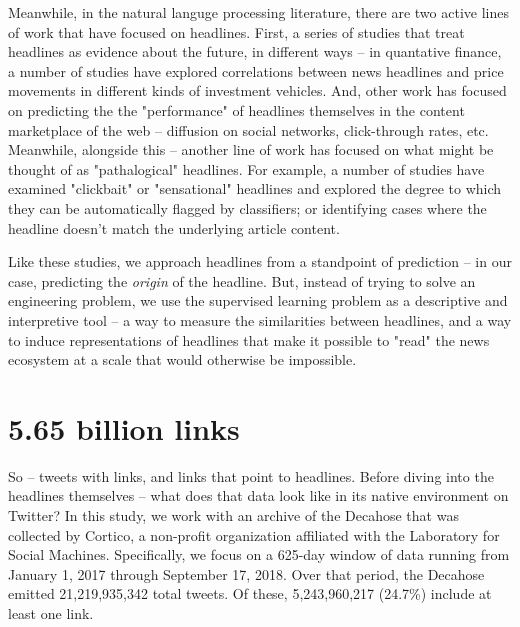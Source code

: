 \documentclass{scrartcl}
\begin{document}
Meanwhile, in the natural languge processing literature, there are two active lines of work that have focused on headlines. First, a series of studies that treat headlines as evidence about the future, in different ways -- in quantative finance, a number of studies have explored correlations between news headlines and price movements in different kinds of investment vehicles.\cite{chan2003stock}\cite{jotaki2018analyzing}\cite{meyer2017fine}\cite{ghosal2017iitp} And, other work has focused on predicting the the "performance" of headlines themselves in the content marketplace of the web -- diffusion on social networks, click-through rates, etc.\cite{kim2016compete}\cite{gabielkov2016social}\cite{piotrkowicz2017headlines}\cite{trilling2017newsworthiness}\cite{reis2015breaking} Meanwhile, alongside this -- another line of work has focused on what might be thought of as "pathalogical" headlines. For example, a number of studies have examined "clickbait"\cite{blom2015click} or "sensational"\cite{molek2013towards} headlines and explored the degree to which they can be automatically flagged by classifiers;\cite{chen2015misleading}\cite{chakraborty2016stop} or identifying cases where the headline doesn't match the underlying article content.\cite{chesney2017incongruent}\cite{ecker2014effects}\cite{wei2017learning}\cite{bourgonje2017clickbait}

Like these studies, we approach headlines from a standpoint of prediction -- in our case, predicting the \textit{origin} of the headline. But, instead of trying to solve an  engineering problem, we use the supervised learning problem as a descriptive and interpretive tool -- a way to measure the similarities between headlines, and a way to induce representations of headlines that make it possible to "read" the news ecosystem at a scale that would otherwise be impossible.

\section{5.65 billion links}

So -- tweets with links, and links that point to headlines. Before diving into the headlines themselves -- what does that data look like in its native environment on Twitter? In this study, we work with an archive of the Decahose that was collected by Cortico, a non-profit organization affiliated with the Laboratory for Social Machines. Specifically, we focus on a 625-day window of data running from January 1, 2017 through September 17, 2018. Over that period, the Decahose emitted 21,219,935,342 total tweets. Of these, 5,243,960,217 (24.7\%) include at least one link.
\end{document}
